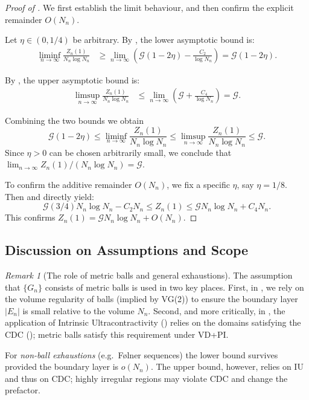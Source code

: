\documentclass{article}
\numberwithin{equation}{section}
\theoremstyle{definition}
\theoremstyle{remark}
\newtheorem{remark}[theorem]{Remark}
\newcommand{\cG}{\mathcal{G}}
\begin{document}
\begin{proof}[Proof of ]
We first establish the limit behaviour, and then confirm the explicit remainder $O(N_n)$.

Let $\eta \in (0,1/4)$ be arbitrary. By , the lower asymptotic bound is:
\begin{align*}
\liminf_{n \to \infty} \frac{Z_n(1)}{N_n \log N_n} &\geq \lim_{n \to \infty} \left( \cG(1-2\eta) - \frac{C_2}{\log N_n} \right) = \cG(1-2\eta).
\end{align*}

By , the upper asymptotic bound is:
\begin{align*}
\limsup_{n \to \infty} \frac{Z_n(1)}{N_n \log N_n} &\leq \lim_{n \to \infty} \left( \cG + \frac{C_4}{\log N_n} \right) = \cG.
\end{align*}

Combining the two bounds we obtain
\[
\cG(1-2\eta) \leq \liminf_{n \to \infty} \frac{Z_n(1)}{N_n \log N_n} \leq \limsup_{n \to \infty} \frac{Z_n(1)}{N_n \log N_n} \leq \cG.
\]
Since $\eta > 0$ can be chosen arbitrarily small, we conclude that $\lim_{n \to \infty} Z_n(1) / (N_n \log N_n) = \cG$.

To confirm the additive remainder $O(N_n)$, we fix a specific $\eta$, say $\eta=1/8$. Then  and  directly yield:
\[
\cG(3/4) N_n \log N_n - C_2 N_n \leq Z_n(1) \leq \cG N_n \log N_n + C_4 N_n.
\]
This confirms $Z_n(1) = \cG N_n \log N_n + O(N_n)$.
\end{proof}

\subsection{Discussion on Assumptions and Scope}

\begin{remark}[The role of metric balls and general exhaustions]
The assumption that $\{G_n\}$ consists of metric balls is used in two key places. First, in , we rely on the volume regularity of balls (implied by VG(2)) to ensure the boundary layer $|E_n|$ is small relative to the volume $N_n$. Second, and more critically, in , the application of Intrinsic Ultracontractivity () relies on the domains satisfying the CDC (); metric balls satisfy this requirement under VD+PI.

For \emph{non-ball exhaustions} (e.g.\ Følner sequences) the lower bound survives provided the boundary layer is $o(N_n)$. The upper bound, however, relies on IU and thus on CDC; highly irregular regions may violate CDC and change the prefactor.
\end{remark}
\end{document}
